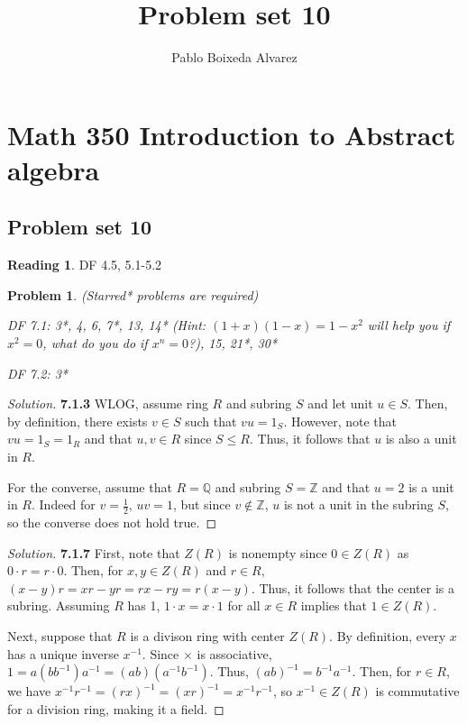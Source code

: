 \documentclass[10pt]{article}
\title{Problem set 10}
\author{Pablo Boixeda Alvarez}
\newtheorem{Prob}{Problem}
\theoremstyle{definition}
\newtheorem{re}{Reading}
\theoremstyle{remark}
\newenvironment{solution}
  {\renewcommand\qedsymbol{$\blacksquare$}\begin{proof}[Solution]}
  {\end{proof}}
\begin{document}
\section*{Math 350 Introduction to Abstract algebra}
\subsection*{Problem set 10}


\begin{re}
	DF 4.5, 5.1-5.2
\end{re}
\begin{Prob} (Starred* problems are required)
	
	DF 7.1: 3*, 4, 6, 7*, 13, 14* (Hint: $(1+x)(1-x)=1-x^2$ will help you if $x^2=0$, what do you do if $x^n=0$?), 15, 21*, 30*
	
	DF 7.2: 3*
	
\end{Prob}

\begin{solution}
\textbf{7.1.3} WLOG, assume ring $R$ and subring $S$ and let unit $u \in S$. Then, by definition, there exists $v \in S$ such that $vu = 1_S$. However, note that $vu = 1_S = 1_R$ and that $u,v \in R$ since $S \leq R$. Thus, it follows that $u$ is also a unit in $R$.

For the converse, assume that $R = \mathbb{Q}$ and subring $S = \mathbb{Z}$ and that $u = 2$ is a unit in $R$. Indeed for $v = \frac{1}{2}$, $uv = 1$, but since $v \notin \mathbb{Z}$, $u$ is not a unit in the subring $S$, so the converse does not hold true.

\end{solution}

\begin{solution}
\textbf{7.1.7} First, note that $Z(R)$ is nonempty since $0 \in Z(R)$ as $0 \cdot r = r \cdot 0$. Then, for $x,y \in Z(R)$ and $r \in R$, $(x-y)r = xr-yr = rx-ry = r(x-y)$. Thus, it follows that the center is a subring. Assuming $R$ has 1, $1 \cdot x = x \cdot 1$ for all $x \in R$ implies that $1 \in Z(R)$.

Next, suppose that $R$ is a divison ring with center $Z(R)$. By definition, every $x$ has a unique inverse $x^{-1}$. Since $\times$ is associative, $1 = a(bb^{-1})a^{-1} = (ab)(a^{-1}b^{-1})$. Thus, $(ab)^{-1} = b^{-1}a^{-1}$. Then, for $r \in R$, we have $x^{-1}r^{-1} = (rx)^{-1} = (xr)^{-1} = x^{-1}r^{-1}$, so $x^{-1} \in Z(R)$ is commutative for a division ring, making it a field.
\end{solution}
\end{document}
